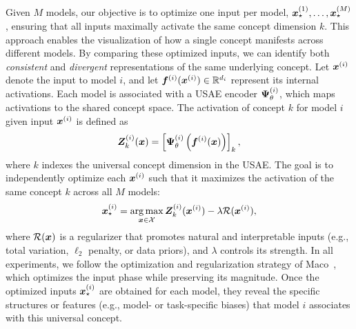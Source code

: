 Given $M$ models, our objective is to optimize one input per model, $\bm{x}^{(1)}_{\star}, \dots, \bm{x}^{(M)}_{\star}$, ensuring that all inputs maximally activate the same concept dimension $k$. This approach enables the visualization of how a single concept manifests across different models. By comparing these optimized inputs, we can identify both \textit{consistent} and \textit{divergent} representations of the same underlying concept. Let $\bm{x}^{(i)}$ denote the input to model $i$, and let $\bm{f}^{(i)}(\bm{x}^{(i)}) \in \mathbb{R}^{d_i}$ represent its internal activations. Each model is associated with a USAE encoder $\bm{\Psi}_{\theta}^{(i)}$, which maps activations to the shared concept space. The activation of concept $k$ for model $i$ given input $\bm{x}^{(i)}$ is defined as
\vspace{-2mm}
\begin{align}
    \bm{Z}_k^{(i)}(\bm{x}) = \left[\bm{\Psi}_{\theta}^{(i)}\left(\bm{f}^{(i)}(\bm{x})\right)\right]_k,
\end{align}
where $k$ indexes the universal concept dimension in the USAE. The goal is to independently optimize each $\bm{x}^{(i)}$ such that it maximizes the activation of the same concept $k$ across all $M$ models:
\begin{align}
    \bm{x}^{(i)}_{\star} = \operatorname*{arg\,max}_{\bm{x} \in \mathcal{X}} \bm{Z}_k^{(i)}(\bm{x}^{(i)}) - \lambda \mathcal{R}(\bm{x}^{(i)}),
\end{align}
where $\mathcal{R}(\bm{x})$ is a %
regularizer
that promotes natural and interpretable inputs (e.g., total variation, $\ell_2$ penalty, or data priors), and $\lambda$ controls its strength.
In all experiments, we follow the optimization and regularization strategy of Maco~\cite{fel2023unlocking}, which optimizes the input phase while preserving its magnitude. Once the optimized inputs $\bm{x}^{(i)}_{\star}$ are obtained for each model, they reveal the specific structures or features (e.g., model- or task-specific biases) that model $i$ associates with this universal concept.














